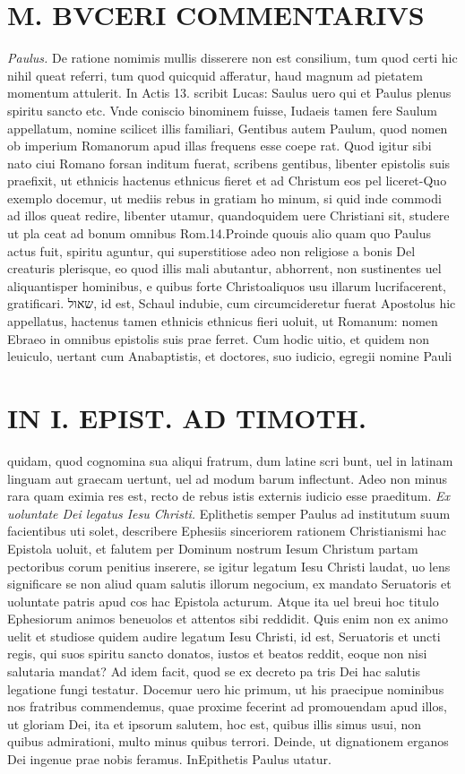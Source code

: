 \documentclass{article}
\begin{document}
\begin{pages}
\section*{M. BVCERI COMMENTARIVS }
\marginpar{[ p.17 ]}
\textit{Paulus. }\pstart De ratione nomimis mullis disserere non est consilium, tum quod certi hic nihil queat referri, tum quod quicquid afferatur, haud magnum ad pietatem momentum attulerit. In Actis 13. scribit Lucas: Saulus uero qui et Paulus plenus spiritu sancto etc. Vnde coniscio binominem fuisse, Iudaeis tamen fere Saulum appellatum, nomine scilicet illis familiari, Gentibus autem Paulum, quod nomen ob imperium Romanorum apud illas frequens esse coepe rat. Quod igitur sibi nato ciui Romano forsan inditum fuerat, scribens gentibus, libenter epistolis suis praefixit, ut ethnicis hactenus ethnicus fieret et ad Christum eos pel liceret-Quo exemplo docemur, ut mediis rebus in gratiam ho minum, si quid inde commodi ad illos queat redire, libenter utamur, quandoquidem uere Christiani sit, studere ut pla ceat ad bonum omnibus Rom.14.Proinde quouis alio quam quo Paulus actus fuit, spiritu aguntur, qui superstitiose adeo non religiose a bonis Del creaturis plerisque, eo quod illis mali abutantur, abhorrent, non sustinentes uel aliquantisper hominibus, e quibus forte Christoaliquos usu illarum lucrifacerent, gratificari. שאול, id est, Schaul indubie, cum circumcideretur fuerat Apostolus hic appellatus, hactenus tamen ethnicis ethnicus fieri uoluit, ut Romanum: nomen Ebraeo in omnibus epistolis suis prae ferret. Cum hodic uitio, et quidem non leuiculo, uertant cum Anabaptistis, et doctores, suo iudicio, egregii  \pendDe nomine Pauli
\section*{IN I. EPIST. AD TIMOTH. }
\marginpar{[ p.compa]}\pstart quidam, quod cognomina sua aliqui fratrum, dum latine scri bunt, uel in latinam linguam aut graecam uertunt, uel ad modum barum inflectunt. Adeo non minus rara quam eximia res est, recto de rebus istis externis iudicio esse praeditum.   \pend
\textit{Ex uoluntate Dei legatus Iesu Christi. }\pstart Eplithetis semper Paulus ad institutum suum facientibus uti solet, describere Ephesiis sinceriorem rationem Christianismi hac Epistola uoluit, et falutem per Dominum nostrum Iesum Christum partam pectoribus   corum penitius inserere, se igitur legatum Iesu Christi laudat, uo lens significare se non aliud quam salutis illorum negocium, ex mandato Seruatoris et uoluntate patris apud cos hac Epistola acturum.  Atque ita uel breui hoc titulo Ephesiorum animos beneuolos et attentos sibi reddidit.  Quis enim non ex animo uelit et studiose quidem audire legatum Iesu Christi, id est, Seruatoris et uncti regis, qui suos spiritu sancto donatos, iustos et beatos reddit, eoque non nisi salutaria mandat? Ad idem facit, quod se ex decreto pa tris Dei hac salutis legatione fungi testatur.   \pend\pstart Docemur uero hic primum, ut his praecipue nominibus nos fratribus commendemus, quae proxime fecerint ad promouendam apud illos, ut gloriam Dei, ita et ipsorum salutem, hoc est, quibus illis simus usui, non quibus admirationi, multo minus quibus terrori.  Deinde, ut dignationem erganos Dei ingenue prae nobis feramus.  In\pend\pstart  \pendQuibus Epithetis Paulus utatur.  

\end{pages}
\end{document}

